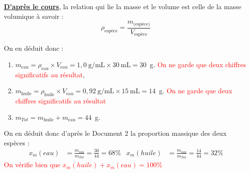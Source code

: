 \textbf{\underline{D'après le cours}}, la relation qui lie la masse et le volume est celle de la masse volumique à savoir :
\begin{equation*}
    \rho_{\text{espèce}} = \frac{m_{\text{(espèce)}}}{V_{\text{espèce}}}
\end{equation*}

On en déduit donc :
\begin{enumerate}
    \item $m_{\text{eau}}=\rho_{\text{eau}}\times V_{\text{eau}}=1,0~\text{g/mL}\times 30~\text{mL}=30$~g. \textcolor{red}{On ne garde que deux chiffres significatifs au résultat},
    \item $m_{\text{huile}}=\rho_{\text{huile}}\times V_{\text{eau}}=0,92~\text{g/mL}\times 15~\text{mL}=14$~g. \textcolor{red}{On ne garde que deux chiffres significatifs au résultat}
    \item $m_{Tot}=m_{\text{huile}}+m_{\text{eau}}=44$~g.
\end{enumerate}

On en déduit donc d'après le Document 2 la proportion massique des deux espèces :
\begin{align*}
    x_m(eau)&=\frac{m_{\text{eau}}}{m_{Tot}}=\frac{30}{44}=68\% & x_m(huile)&=\frac{m_{\text{eau}}}{m_{Tot}}=\frac{14}{44}=32\% 
\end{align*}
\textcolor{red}{On vérifie bien que $x_m(huile)+x_m(eau)=100\%$}